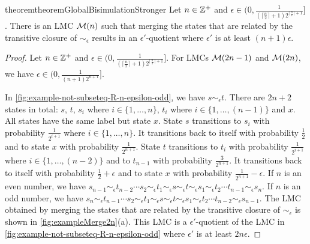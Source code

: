 

\begin{restatable}{theorem}{theoremGlobalBisimulationStronger}\label{theorem:global-bisimulation-is-stronger}
	Let $n \in \mathbb{Z}^{+}$ and $\epsilon \in (0,  \frac{1}{(\lceil\frac{n}{2}\rceil +1)2^{\lceil\frac{n}{2}\rceil +1}}]$. There is an LMC $\mathcal{M}(n)$ such that merging the states that are related by the transitive closure of $\sim_{\epsilon}$ results in an $\epsilon'$-quotient where $\epsilon'$ is at least $(n+1)\epsilon$. 
\end{restatable}
\begin{proof}
	Let  $n \in \mathbb{Z}^{+}$ and $\epsilon \in (0, \frac{1}{(\lceil\frac{n}{2}\rceil +1)2^{\lceil\frac{n}{2}\rceil +1}}]$. For LMCs $\mathcal{M}(2n-1)$ and $\mathcal{M}(2n)$, we have $\epsilon \in (0, \frac{1}{(n+1)2^{n+1}}]$.
	
	In \cref{fig:example-not-subseteq-R-n-epsilon-odd}, we have $s \sim_{\epsilon} t$. There are $2n+2$ states in total: $s$, $t$, $s_i$ where $i\in\{1,\ldots,n\}$, $t_i$ where $i\in \{1,\ldots,(n-1)\}$ and $x$. All states have the same label but state $x$. State $s$ transitions to $s_i$ with probability $\frac{1}{2^{i+1}}$ where $i \in \{1,\ldots,n\}$. It transitions back to itself with probability $\frac{1}{2}$ and to state $x$ with probability $\frac{1}{2^{n+1}}$. State $t$ transitions to $t_i$ with probability $\frac{1}{2^{i+1}}$ where $i \in \{1,\ldots,(n-2)\}$ and to $t_{n-1}$ with probability $\frac{3}{2^{n+1}}$. It transitions back to itself with probability $\frac{1}{2}+\epsilon$ and to state $x$ with probability $\frac{1}{2^{n+1}}-\epsilon$.  If $n$ is an even number, we have $s_{n-1} \sim_{\epsilon}  t_{n-2}  \cdots s_2 \sim_{\epsilon}  t_1 \sim_{\epsilon}  s \sim_{\epsilon} t \sim_{\epsilon}  s_1 \sim_{\epsilon}  t_2 \cdots  t_{n-1} \sim_{\epsilon} s_{n}$. If $n$ is an odd number, we have $s_{n} \sim_{\epsilon}  t_{n-1}  \cdots s_2 \sim_{\epsilon}  t_1 \sim_{\epsilon}  s \sim_{\epsilon} t \sim_{\epsilon}  s_1 \sim_{\epsilon}  t_2 \cdots  t_{n-2} \sim_{\epsilon} s_{n-1}$. The  LMC obtained by merging the states that are related by the transitive closure of $\sim_{\epsilon}$ is shown in \cref{fig:exampleMerge2n}(a). This LMC is a $\epsilon'$-quotient of the LMC in \cref{fig:example-not-subseteq-R-n-epsilon-odd} where $\epsilon'$ is at least $2n\epsilon$.
	
	

\end{proof}
